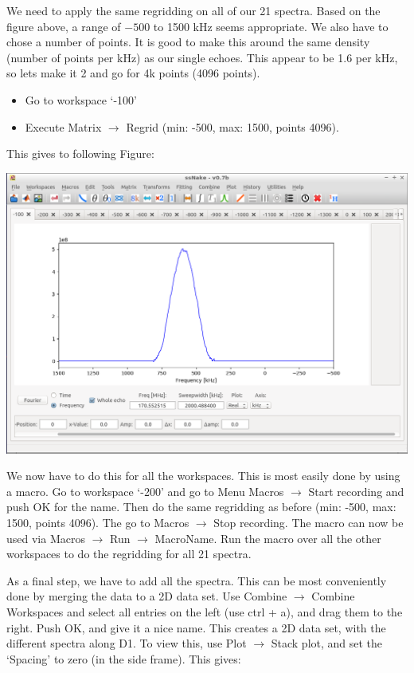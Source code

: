 \documentclass[11pt,a4paper]{article}
\begin{document}
We need to apply the same regridding on all of our 21 spectra. Based on the figure above, a range of
$-500$ to 1500 kHz seems appropriate. We also have to chose a number of points. It is good to make
this around the same density (number of points per kHz) as our single echoes. This appear to be 1.6
per kHz, so lets make it 2 and go for 4k points (4096 points). 


\begin{itemize}
\item Go to workspace `-100' 
 \item Execute Matrix $\longrightarrow$ Regrid (min: -500, max: 1500, points 4096).
\end{itemize}

This gives to following Figure:

\begin{center}
\includegraphics[width=0.8\linewidth]{Figs/Fig2.png}
\end{center}
We now have to do this for all the workspaces. This is most easily done by using a macro. Go to
workspace `-200' and go to Menu Macros $\longrightarrow$ Start recording and push OK for the name.
Then do the same regridding as before (min: -500, max: 1500, points 4096). The go to Macros
$\longrightarrow$ Stop recording. The macro can now be used via Macros $\longrightarrow$ Run
$\longrightarrow$ MacroName. Run the macro over all the other workspaces to do the regridding for
all 21 spectra.

As a final step, we have to add all the spectra. This can be most conveniently done by merging the
data to a 2D data set. Use Combine $\longrightarrow$ Combine Workspaces and select all entries on
the left (use ctrl + a), and drag them to the right. Push OK, and give it a nice name. This creates
a 2D data set, with the different spectra along D1. To view this, use Plot $\longrightarrow$ Stack
plot, and set the `Spacing' to zero (in the side frame). This gives:
\end{document}
